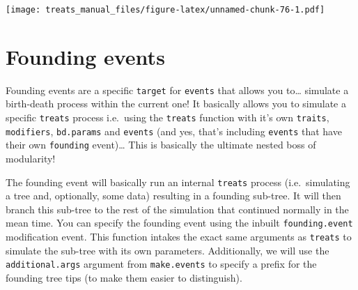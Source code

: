 \documentclass[
]{book}
\begin{document}
\texttt{[image: treats\_manual\_files/figure-latex/unnamed-chunk-76-1.pdf]}

\hypertarget{founding}{%
\section{Founding events}\label{founding}}

Founding events are a specific \texttt{target} for \texttt{events} that allows you to\ldots{} simulate a birth-death process within the current one!
It basically allows you to simulate a specific \texttt{treats} process i.e.~using the \texttt{treats} function with it's own \texttt{traits}, \texttt{modifiers}, \texttt{bd.params} and \texttt{events} (and yes, that's including \texttt{events} that have their own \texttt{founding} event)\ldots{}
This is basically the ultimate nested boss of modularity!

The founding event will basically run an internal \texttt{treats} process (i.e.~simulating a tree and, optionally, some data) resulting in a founding sub-tree.
It will then branch this sub-tree to the rest of the simulation that continued normally in the mean time.
You can specify the founding event using the inbuilt \texttt{founding.event} modification event.
This function intakes the exact same arguments as \texttt{treats} to simulate the sub-tree with its own parameters.
Additionally, we will use the \texttt{additional.args} argument from \texttt{make.events} to specify a prefix for the founding tree tips (to make them easier to distinguish).
\end{document}
